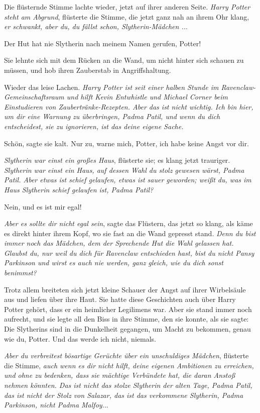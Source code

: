 Die flüsternde Stimme lachte wieder, jetzt auf ihrer anderen Seite. \glqq{}
\emph{Harry Potter steht am Abgrund}\grqq{}, flüsterte die Stimme, die jetzt
ganz nah an ihrem Ohr klang, \glqq{}\emph{er schwankt, aber du, du fällst schon,
Slytherin-Mädchen ..}.\grqq{}

\glqq{}Der Hut hat nie Slytherin nach meinem Namen gerufen, Potter!\grqq{}

Sie lehnte sich mit dem Rücken an die Wand, um nicht hinter sich schauen zu
müssen, und hob ihren Zauberstab in Angriffshaltung.

Wieder das leise Lachen. \glqq{}\emph{Harry Potter ist seit einer halben Stunde
im Ravenclaw-Gemeinschaftsraum und hilft Kevin Entwhistle und Michael Corner
beim Einstudieren von Zaubertränke-Rezepten. Aber das ist nicht wichtig. Ich bin
hier, um dir eine Warnung zu überbringen, Padma Patil, und wenn du dich
entscheidest, sie zu ignorieren, ist das deine eigene Sache.}\grqq{}

\glqq{}Schön\grqq{}, sagte sie kalt. \glqq{}Nur zu, warne mich, Potter, ich habe
keine Angst vor dir.\grqq{}

\glqq{}\emph{Slytherin war einst ein großes Haus}\grqq{}, flüsterte sie; es klang
jetzt trauriger. \glqq{}\emph{Slytherin war einst ein Haus, auf dessen Wahl du
stolz gewesen wärst, Padma Patil. Aber etwas ist schief gelaufen, etwas ist
sauer geworden; weißt du, was im Haus Slytherin schief gelaufen ist, Padma
Patil?}\grqq{}

\glqq{}Nein, und es ist mir egal!\grqq{}

\glqq{}\emph{Aber es sollte dir nicht egal sein}\grqq{}, sagte das Flüstern, das
jetzt so klang, als käme es direkt hinter ihrem Kopf, wo sie fast an die Wand
gepresst stand. \glqq{}\emph{Denn du bist immer noch das Mädchen, dem der
Sprechende Hut die Wahl gelassen hat. Glaubst du, nur weil du dich für Ravenclaw
entschieden hast, bist du nicht Pansy Parkinson und wirst es auch nie werden,
ganz gleich, wie du dich sonst benimmst?}\grqq{}

Trotz allem breiteten sich jetzt kleine Schauer der Angst auf ihrer Wirbelsäule
aus und liefen über ihre Haut. Sie hatte diese Geschichten auch über Harry
Potter gehört, dass er ein heimlicher Legilimens war. Aber sie stand immer noch
aufrecht, und sie legte all den Biss in ihre Stimme, den sie konnte, als sie
sagte: \glqq{}Die Slytherins sind in die Dunkelheit gegangen, um Macht zu
bekommen, genau wie du, Potter. Und das werde ich nicht, niemals.\grqq{}

\glqq{}\emph{Aber du verbreitest bösartige Gerüchte über ein unschuldiges
Mädchen}\grqq{}, flüsterte die Stimme, \glqq{}\emph{auch wenn es dir nicht hilft,
deine eigenen Ambitionen zu erreichen, und ohne zu bedenken, dass sie mächtige
Verbündete hat, die daran Anstoß nehmen könnten. Das ist nicht das stolze
Slytherin der alten Tage, Padma Patil, das ist nicht der Stolz von Salazar, das
ist das verkommene Slytherin, Padma Parkinson, nicht Padma Malfoy.}..\grqq{}

